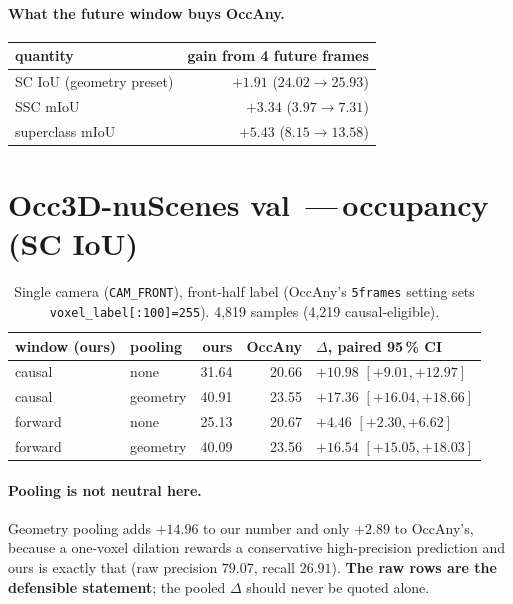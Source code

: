 \documentclass[11pt,a4paper]{article}
\newcommand{\us}{\textbf{ours}}
\newcommand{\nm}{\,---\,}
\begin{document}
\paragraph{What the future window buys OccAny.}
\begin{center}
\begin{tabular}{lr}
\toprule
quantity & gain from 4 future frames \\
\midrule
SC IoU (geometry preset) & $+1.91$ \quad ($24.02\rightarrow25.93$) \\
SSC mIoU & $\mathbf{+3.34}$ \quad ($3.97\rightarrow7.31$) \\
superclass mIoU & $+5.43$ \quad ($8.15\rightarrow13.58$) \\
\bottomrule
\end{tabular}
\end{center}

\section{Occ3D-nuScenes val \nm occupancy (SC IoU)}

\begin{table}[h]\centering
\begin{tabular}{llrrl}
\toprule
window (ours) & pooling & \us & OccAny & $\Delta$, paired 95\,\% CI \\
\midrule
causal  & none     & 31.64 & 20.66 & $\mathbf{+10.98}$ $[+9.01,+12.97]$ \\
causal  & geometry & 40.91 & 23.55 & $+17.36$ $[+16.04,+18.66]$ \\
forward & none     & 25.13 & 20.67 & $+4.46$ $[+2.30,+6.62]$ \\
forward & geometry & 40.09 & 23.56 & $+16.54$ $[+15.05,+18.03]$ \\
\bottomrule
\end{tabular}
\caption{Single camera (\texttt{CAM\_FRONT}), front-half label (OccAny's \texttt{5frames} setting sets
\texttt{voxel\_label[:100]=255}). 4{,}819 samples (4{,}219 causal-eligible).}
\end{table}

\paragraph{Pooling is not neutral here.} Geometry pooling adds $+14.96$ to our number and only $+2.89$
to OccAny's, because a one-voxel dilation rewards a conservative high-precision prediction and ours is
exactly that (raw precision $79.07$, recall $26.91$). \textbf{The raw rows are the defensible
statement}; the pooled $\Delta$ should never be quoted alone.
\end{document}
